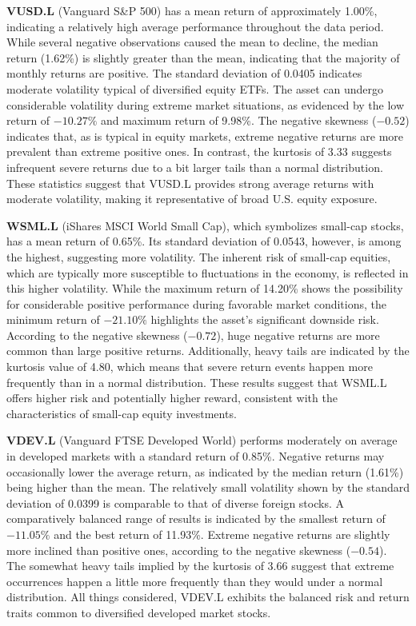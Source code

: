 \documentclass[12pt]{article}
\begin{document}
\textbf{VUSD.L} (Vanguard S\&P 500) has a mean return of approximately 1.00\%, indicating a relatively high average performance throughout the data period. While several negative observations caused the mean to decline, the median return (1.62\%) is slightly greater than the mean, indicating that the majority of monthly returns are positive. The standard deviation of 0.0405 indicates moderate volatility typical of diversified equity ETFs. The asset can undergo considerable volatility during extreme market situations, as evidenced by the low return of $-10.27\%$ and maximum return of 9.98\%. The negative skewness ($-0.52$) indicates that, as is typical in equity markets, extreme negative returns are more prevalent than extreme positive ones. In contrast, the kurtosis of 3.33 suggests infrequent severe returns due to a bit larger tails than a normal distribution. These statistics suggest that VUSD.L provides strong average returns with moderate volatility, making it representative of broad U.S. equity exposure.

\textbf{WSML.L} (iShares MSCI World Small Cap), which symbolizes small-cap stocks, has a mean return of 0.65\%. Its standard deviation of 0.0543, however, is among the highest, suggesting more volatility. The inherent risk of small-cap equities, which are typically more susceptible to fluctuations in the economy, is reflected in this higher volatility. While the maximum return of 14.20\% shows the possibility for considerable positive performance during favorable market conditions, the minimum return of $-21.10\%$ highlights the asset's significant downside risk. According to the negative skewness ($-0.72$), huge negative returns are more common than large positive returns. Additionally, heavy tails are indicated by the kurtosis value of 4.80, which means that severe return events happen more frequently than in a normal distribution. These results suggest that WSML.L offers higher risk and potentially higher reward, consistent with the characteristics of small-cap equity investments.

\textbf{VDEV.L} (Vanguard FTSE Developed World) performs moderately on average in developed markets with a standard return of 0.85\%. Negative returns may occasionally lower the average return, as indicated by the median return (1.61\%) being higher than the mean. The relatively small volatility shown by the standard deviation of 0.0399 is comparable to that of diverse foreign stocks. A comparatively balanced range of results is indicated by the smallest return of $-11.05\%$ and the best return of 11.93\%. Extreme negative returns are slightly more inclined than positive ones, according to the negative skewness ($-0.54$). The somewhat heavy tails implied by the kurtosis of 3.66 suggest that extreme occurrences happen a little more frequently than they would under a normal distribution. All things considered, VDEV.L exhibits the balanced risk and return traits common to diversified developed market stocks.
\end{document}
